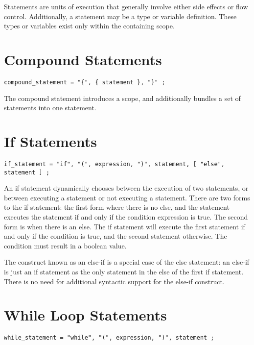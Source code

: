 \documentclass[letterpaper,12pt]{book}
\begin{document}
Statements are units of execution that generally involve either side effects or flow control. Additionally, a statement may be a type or variable definition. These types or variables exist only within the containing scope.

\section{Compound Statements}

\begin{lstlisting}[breaklines=true]
compound_statement = "{", { statement }, "}" ;
\end{lstlisting}

The compound statement introduces a scope, and additionally bundles a set of statements into one statement.

\section{If Statements}

\begin{lstlisting}[breaklines=true]
if_statement = "if", "(", expression, ")", statement, [ "else", statement ] ;
\end{lstlisting}

An if statement dynamically chooses between the execution of two statements, or between executing a statement or not executing a statement. There are two forms to the if statement: the first form where there is no else, and the statement executes the statement if and only if the condition expression is true. The second form is when there is an else. The if statement will execute the first statement if and only if the condition is true, and the second statement otherwise. The condition must result in a boolean value.

The construct known as an else-if is a special case of the else statement: an else-if is just an if statement as the only statement in the else of the first if statement. There is no need for additional syntactic support for the else-if construct.

\section{While Loop Statements}

\begin{lstlisting}[breaklines=true]
while_statement = "while", "(", expression, ")", statement ;
\end{lstlisting}
\end{document}
